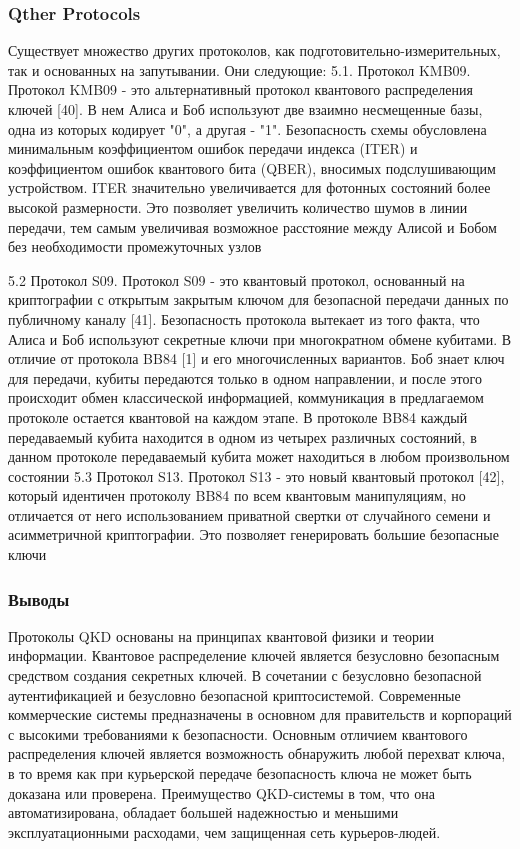 \subsubsection{Qther Protocols}

Существует множество других протоколов, как подготовительно-измерительных, так и основанных на запутывании. Они следующие:
5.1. Протокол KMB09. Протокол KMB09 - это альтернативный протокол квантового распределения ключей [40]. В нем Алиса и Боб используют две взаимно несмещенные базы, одна из которых кодирует "0", а другая - "1". Безопасность схемы обусловлена минимальным коэффициентом ошибок передачи индекса (ITER) и коэффициентом ошибок квантового бита (QBER), вносимых подслушивающим устройством.
ITER значительно увеличивается для фотонных состояний более высокой размерности. Это позволяет увеличить количество шумов в линии передачи, тем самым увеличивая возможное расстояние между Алисой и Бобом без необходимости промежуточных узлов

5.2 Протокол S09. Протокол S09 - это квантовый протокол, основанный на криптографии с открытым закрытым ключом для безопасной передачи данных по публичному каналу [41]. Безопасность протокола вытекает из того факта, что Алиса и Боб используют секретные ключи при многократном обмене кубитами. В отличие от протокола BB84 [1] и его многочисленных вариантов. Боб знает ключ для передачи, кубиты передаются только в одном направлении, и после этого происходит обмен классической информацией, коммуникация в предлагаемом протоколе остается квантовой на каждом этапе. В протоколе BB84 каждый передаваемый кубита находится в одном из четырех различных состояний, в данном протоколе передаваемый кубита может находиться в любом произвольном состоянии
5.3 Протокол S13. Протокол S13 - это новый квантовый протокол [42], который идентичен протоколу BB84 по всем квантовым манипуляциям, но отличается от него использованием приватной свертки от случайного семени и асимметричной криптографии. Это позволяет генерировать большие безопасные ключи

\subsubsection{Выводы}
Протоколы QKD основаны на принципах квантовой физики и теории информации. Квантовое распределение ключей является безусловно безопасным средством создания секретных ключей. В сочетании с безусловно безопасной аутентификацией и безусловно безопасной криптосистемой.
Современные коммерческие системы предназначены в основном для правительств и корпораций с высокими требованиями к безопасности. Основным отличием квантового распределения ключей является возможность обнаружить любой перехват ключа, в то время как при курьерской передаче безопасность ключа не может быть доказана или проверена. Преимущество QKD-системы в том, что она автоматизирована, обладает большей надежностью и меньшими эксплуатационными расходами, чем защищенная сеть курьеров-людей.
